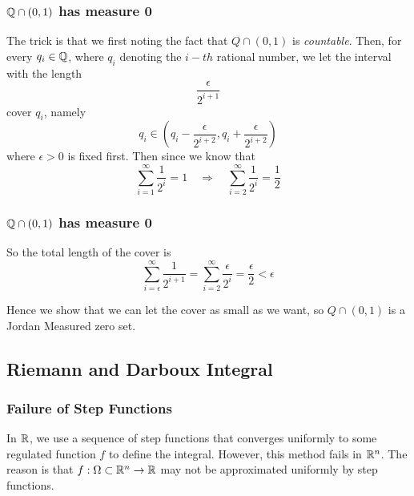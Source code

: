 \documentclass[12pt, t]{beamer}
\renewcommand{\emph}[1]{{\color{Turquoise3}\textsl{#1}}}
\begin{document}
\begin{frame}
    \frametitle{$\mathbb{Q}\cap (0,1)$ has measure 0}
    \par The trick is that we first noting the fact that $Q\cap (0,1)$ is
    \emph{countable}. Then, for every $q_i\in\mathbb{Q}$, where $q_i$ denoting the $i-th$ rational number, we let the interval with the length
    \begin{equation*}
        \frac{\epsilon}{2^{i+1}}
    \end{equation*}
    cover $q_i$, namely
    \begin{equation*}
        q_i \in (q_i - \frac{\epsilon}{2^{i+2}}, q_i + \frac{\epsilon}{2^{i+2}})
    \end{equation*}
    where $\epsilon > 0$ is fixed first. Then since we know that
    \begin{equation*}
        \sum^\infty_{i = 1}\frac{1}{2^i} = 1\quad\Rightarrow\quad \sum^\infty_{i = 2}\frac{1}{2^i} = \frac{1}{2}
    \end{equation*}
\end{frame}


\begin{frame}
    \frametitle{$\mathbb{Q}\cap (0,1)$ has measure 0}

    \par So the total length of the cover is
    \begin{equation*}
        \sum^\infty_{i = \epsilon}\frac{1}{2^{i+1}} = \sum^\infty_{i = 2}\frac{\epsilon}{2^i} = \frac{\epsilon}{2}<\epsilon
    \end{equation*}

    \par Hence we show that we can let the cover as small as we want, so $Q\cap (0,1)$ is a Jordan Measured zero set.

\end{frame}

\subsection{Riemann and Darboux Integral}
\begin{frame}
    \frametitle{Failure of Step Functions }
    In $\mathbb{R}$, we use a sequence of step functions that converges uniformly to some regulated function $f$ to define the integral. However, this method fails in $\mathbb{R}^n$. The reason is that $f:\Omega\subset\mathbb{R}^n\to\mathbb{R}$  may not be approximated uniformly by step functions.
\end{frame}
\end{document}
